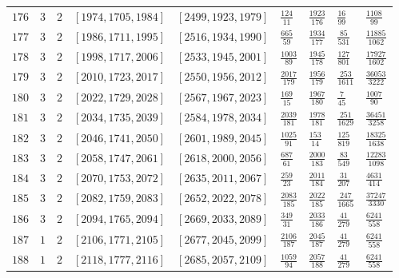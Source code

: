 \documentclass[12pt]{extarticle}
\begin{document}
\begin{longtable}{lllllllll}
$176$ & $3$ & $2$ & $\left[1974, 1705, 1984\right]$ & $\left[2499, 1923, 1979\right]$ & $\frac{124}{11}$ & $\frac{1923}{176}$ & $\frac{16}{99}$ & $\frac{1108}{99}$ \\
$177$ & $3$ & $2$ & $\left[1986, 1711, 1995\right]$ & $\left[2516, 1934, 1990\right]$ & $\frac{665}{59}$ & $\frac{1934}{177}$ & $\frac{85}{531}$ & $\frac{11885}{1062}$ \\
$178$ & $3$ & $2$ & $\left[1998, 1717, 2006\right]$ & $\left[2533, 1945, 2001\right]$ & $\frac{1003}{89}$ & $\frac{1945}{178}$ & $\frac{127}{801}$ & $\frac{17927}{1602}$ \\
$179$ & $3$ & $2$ & $\left[2010, 1723, 2017\right]$ & $\left[2550, 1956, 2012\right]$ & $\frac{2017}{179}$ & $\frac{1956}{179}$ & $\frac{253}{1611}$ & $\frac{36053}{3222}$ \\
$180$ & $3$ & $2$ & $\left[2022, 1729, 2028\right]$ & $\left[2567, 1967, 2023\right]$ & $\frac{169}{15}$ & $\frac{1967}{180}$ & $\frac{7}{45}$ & $\frac{1007}{90}$ \\
$181$ & $3$ & $2$ & $\left[2034, 1735, 2039\right]$ & $\left[2584, 1978, 2034\right]$ & $\frac{2039}{181}$ & $\frac{1978}{181}$ & $\frac{251}{1629}$ & $\frac{36451}{3258}$ \\
$182$ & $3$ & $2$ & $\left[2046, 1741, 2050\right]$ & $\left[2601, 1989, 2045\right]$ & $\frac{1025}{91}$ & $\frac{153}{14}$ & $\frac{125}{819}$ & $\frac{18325}{1638}$ \\
$183$ & $3$ & $2$ & $\left[2058, 1747, 2061\right]$ & $\left[2618, 2000, 2056\right]$ & $\frac{687}{61}$ & $\frac{2000}{183}$ & $\frac{83}{549}$ & $\frac{12283}{1098}$ \\
$184$ & $3$ & $2$ & $\left[2070, 1753, 2072\right]$ & $\left[2635, 2011, 2067\right]$ & $\frac{259}{23}$ & $\frac{2011}{184}$ & $\frac{31}{207}$ & $\frac{4631}{414}$ \\
$185$ & $3$ & $2$ & $\left[2082, 1759, 2083\right]$ & $\left[2652, 2022, 2078\right]$ & $\frac{2083}{185}$ & $\frac{2022}{185}$ & $\frac{247}{1665}$ & $\frac{37247}{3330}$ \\
$186$ & $3$ & $2$ & $\left[2094, 1765, 2094\right]$ & $\left[2669, 2033, 2089\right]$ & $\frac{349}{31}$ & $\frac{2033}{186}$ & $\frac{41}{279}$ & $\frac{6241}{558}$ \\
$187$ & $1$ & $2$ & $\left[2106, 1771, 2105\right]$ & $\left[2677, 2045, 2099\right]$ & $\frac{2106}{187}$ & $\frac{2045}{187}$ & $\frac{41}{279}$ & $\frac{6241}{558}$ \\
$188$ & $1$ & $2$ & $\left[2118, 1777, 2116\right]$ & $\left[2685, 2057, 2109\right]$ & $\frac{1059}{94}$ & $\frac{2057}{188}$ & $\frac{41}{279}$ & $\frac{6241}{558}$ \\

\end{longtable}
\end{document}

